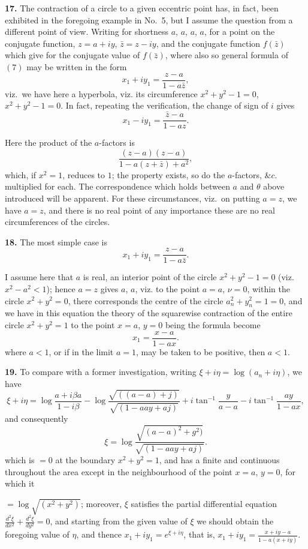\documentclass[11pt,a4paper]{book}
\begin{document}
\textbf{17.} The contraction of a circle to a given eccentric point has, in fact, been exhibited in the foregoing example in No.\ 5, but I assume the question from a different point of view. Writing for shortness $a$, $a$, $a$, $a$, for a point on the conjugate function, $z = a + iy$, $\bar{z} = z - iy$, and the conjugate function $f(\bar{z})$ which give for the conjugate value of $f(\bar{z})$, where also so general formula of $(7)$ may be written in the form
\[
x_1 + iy_1 = \frac{z - a}{1 - a\bar{z}},
\]
viz.\ we have here a hyperbola, viz. its circumference $x^2 + y^2 - 1 = 0$, $x^2 + y^2 - 1 = 0$. In fact, repeating the verification, the change of sign of $i$ gives
\[
x_1 - iy_1 = \frac{\bar{z} - a}{1 - a z}.
\]

Here the product of the $a$-factors is
\[
\frac{(z - a)(z - a)}{1 - a(z + \bar{z}) + a^2},
\]
which, if $x^2 = 1$, reduces to $1$; the property exists, so do the $a$-factors, $\&c.$ multiplied for each. The correspondence which holds between $a$ and $\theta$ above introduced will be apparent. For these circumstances, viz.\ on putting $a = z$, we have $a = z$, and there is no real point of any importance these are no real circumferences of the circles.

\textbf{18.} The most simple case is
\[
x_1 + iy_1 = \frac{z - a}{1 - a \bar{z}}.
\]

I assume here that $a$ is real, an interior point of the circle $x^2 + y^2 - 1 = 0$ (viz. $x^2 - a^2 < 1$); hence $a = z$ gives $a$, $a$, viz. to the point $a = a$, $\nu = 0$, within the circle $x^2 + y^2 = 0$, there corresponds the centre of the circle $a_n^2 + y_n^2 = 1 = 0$, and we have in this equation the theory of the squarewise contraction of the entire circle $x^2 + y^2 = 1$ to the point $x = a$, $y = 0$ being the formula become
\[
x_1 = \frac{x - a}{1 - a x}.
\]
where $a < 1$, or if in the limit $a = 1$, may be taken to be positive, then $a < 1$.

\textbf{19.} To compare with a former investigation, writing $\xi + i\eta = \log (a_n + i\eta)$, we have
\[
\xi + i\eta = \log \frac{a + i\beta a}{1 - i\beta} - \log \frac{\sqrt{((a - a) + j)}}{\sqrt{(1 - a a y + a j)}} + i \tan^{-1}\frac{y}{a - a} - i \tan^{-1}\frac{a y}{1 - a x},
\]
and consequently
\[
\xi = \log \frac{\sqrt{(a - a)^2 + g^2)}}{\sqrt{(1 - a a y + a j)}}.
\]
which is $= 0$ at the boundary $x^2 + y^2 = 1$, and has a finite and continuous throughout the area except in the neighbourhood of the point $x = a$, $y = 0$, for which it

$= \log \sqrt{(x^2 + y^2)}$; moreover, $\xi$ satisfies the partial differential equation $\frac{d^2 \xi}{dx^2} + \frac{d^2 \xi}{dy^2} = 0$, and starting from the given value of $\xi$ we should obtain the foregoing value of $\eta$, and thence $x_1 + iy_1 = e^{\xi + i\eta}$, that is, $x_1 + iy_1 = \frac{x + iy - a}{1 - a(x + iy)}$.
\end{document}
